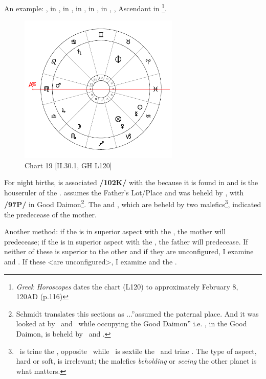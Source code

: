 An example: \Sun, \Mercury\xspace in \Aquarius, \Moon\xspace in \Scorpio, \Saturn\xspace in \Cancer, \Jupiter\xspace in \Libra, \Venus\xspace in \Capricorn, \Mars, Ascendant in \Virgo
\footnote{\textit{Greek Horoscopes} dates the chart (L120) to approximately February 8, 120AD (p.116)}.

\clearpage
\begin{figure}
\centering
\vspace{-20pt}
\includegraphics[width=0.68\textwidth]{charts/2_30_1}
\caption{Chart 19 [II.30.1, GH L120]}
\label{fig:chart19}
\end{figure}

For night births, \Saturn\xspace is associated \textbf{/102K/} with the \Moon\xspace because it is found in  and is the houseruler of the \Sun\xspace. \Saturn\xspace assumes the Father’s Lot/Place and was beheld by \Jupiter, with \Venus\xspace \textbf{/97P/} in Good Daimon\footnote{Schmidt translates this sections as \Saturn...''assumed the paternal place. And it was looked at by \Jupiter\, and \Venus\, while occupying the Good Daimon'' i.e. \Saturn, in the Good Daimon, is beheld by \Jupiter\, and \Venus.}. The \Moon\xspace and \Venus, which are beheld by two malefics\footnote{\Saturn\, is trine the \Moon, opposite \Venus\, while \Mars\, is sextile the \Moon\, and trine \Venus. The type of aspect, hard or soft, is irrelevant; the malefics \textsl{beholding} or \textsl{seeing} the other planet is what matters.}, indicated the predecease of the mother.

Another method: if the \Sun\xspace is in superior aspect with the \Moon, the mother will predecease; if the \Moon\xspace is in superior aspect with the \Sun, the father will predecease. If neither of these is superior to the other and if they are unconfigured, I examine \Saturn\xspace and \Venus. If these <are unconfigured>, I examine \Saturn\xspace and the \Moon. 

